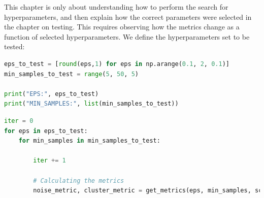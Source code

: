 This chapter is only about understanding how to perform the search for hyperparameters, and then explain how the correct parameters were selected in the chapter on testing.
This requires observing how the metrics change as a function of selected hyperparameters. We define the hyperparameters set to be tested:

\begin{lstlisting}[language=Python]
eps_to_test = [round(eps,1) for eps in np.arange(0.1, 2, 0.1)]
min_samples_to_test = range(5, 50, 5)

print("EPS:", eps_to_test)
print("MIN_SAMPLES:", list(min_samples_to_test))
\end{lstlisting}


\begin{minipage}{\linewidth}
\begin{lstlisting}[language=Python]
iter = 0
for eps in eps_to_test:
    for min_samples in min_samples_to_test:
        
        iter += 1

        # Calculating the metrics
        noise_metric, cluster_metric = get_metrics(eps, min_samples, scaled_df, iter_)
\end{lstlisting}
\end{minipage}
